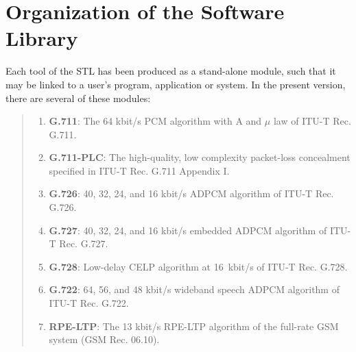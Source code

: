\section{Organization of the Software Library}

Each tool of the STL has been produced as a stand-alone module, such
that it may be linked to a user's program, application or system. In
the present version, there are several of these modules:

\begin{quote}
\begin{enumerate}
\item {\bf G.711}: The 64 kbit/s PCM algorithm with A and $\mu$ law of ITU-T Rec. G.711.

\item {\bf G.711-PLC}: The high-quality, low complexity packet-loss concealment specified in ITU-T Rec. G.711 Appendix I.

\item {\bf G.726}: 40, 32, 24, and 16 kbit/s ADPCM algorithm of ITU-T Rec. G.726.

\item {\bf G.727}: 40, 32, 24, and 16 kbit/s embedded ADPCM algorithm of ITU-T Rec. G.727.

\item {\bf G.728}: Low-delay CELP algorithm at 16~kbit/s of ITU-T Rec. G.728.

\item {\bf G.722}: 64, 56, and 48 kbit/s wideband speech ADPCM algorithm of ITU-T Rec. G.722.

\item {\bf RPE-LTP}: The 13 kbit/s RPE-LTP algorithm of the full-rate GSM system (GSM Rec. 06.10).


\end{enumerate}
\end{quote}
